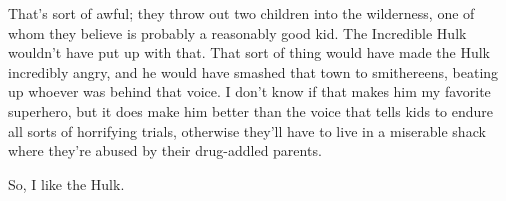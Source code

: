 \documentclass[a4paper,12pt]{article}
\newcommand{\shunt}{\vspace{20mm}}
\begin{document}
That's sort of awful; they throw out two children into the wilderness, one of whom they believe is probably a reasonably good kid. The Incredible Hulk wouldn't have put up with that. That sort of thing would have made the Hulk incredibly angry, and he would have smashed that town to smithereens, beating up whoever was behind that voice. I don't know if that makes him my favorite superhero, but it does make him better than the voice that tells kids to endure all sorts of horrifying trials, otherwise they'll have to live in a miserable shack where they're abused by their drug-addled parents.

So, I like the Hulk.
\shunt
\end{document}
